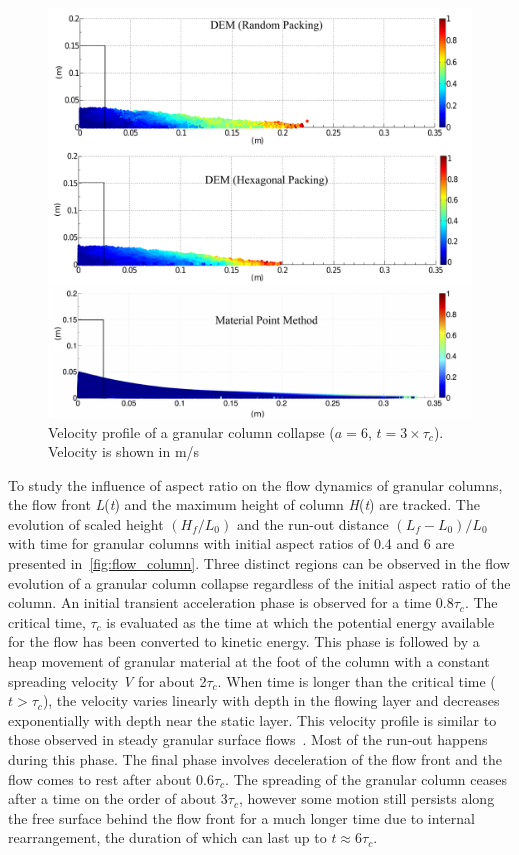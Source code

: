 \begin{figure}[tbhp]
\centering
\includegraphics[width=\textwidth]{a6f}
\caption[Velocity profile of a granular column collapse ($a = 6$, 
$t=3\times\tau_c$)]{Velocity profile of a granular column collapse ($a = 6$, 
$t=3\times\tau_c$). Velocity is shown in m/s}
\label{fig:a6f}
\end{figure}

To study the influence of aspect ratio on the flow dynamics of granular 
columns, the flow front \textit{L}(\textit{t}) and the maximum height of column 
\textit{H}(\textit{t}) are tracked. The evolution of scaled height 
$(H_{{f}}/L_{0})$ and the run-out distance 
$(L_{{f}}-L_{0})/L_{0}$ with time for granular columns 
with initial aspect ratios of 0.4 and 6 are presented 
in~\cref{fig:flow_column}. Three distinct regions can be observed in the flow 
evolution of a granular column collapse regardless of the initial aspect ratio 
of the column. An initial transient acceleration phase is observed for a time 
0.8$\tau_{c}$. The critical time, $\tau_c$ is evaluated as the time at which 
the potential energy available for the flow has been converted to kinetic 
energy. This phase is followed by a heap movement of granular material at the 
foot of the column with a constant spreading velocity \textit{V} for about 
2$\tau_{c}$. When time is longer than the critical time ($t > \tau_{c}$), the 
velocity varies linearly with depth in the flowing layer and decreases 
exponentially with depth near the static layer. This velocity profile is 
similar to those observed in steady granular surface 
flows~\citep{Lajeunesse2004}. Most of the run-out happens during this phase. 
The final phase involves deceleration of the flow front and the flow comes to 
rest after about 0.6$\tau_{c}$. The spreading of the granular column ceases 
after a time on the order of about 3$\tau_{c}$, however some motion still 
persists along the free surface behind the flow front for a much longer time 
due to internal rearrangement, the duration of which can last up to $\textit{t} 
\approx 6\tau_{c}$. 

